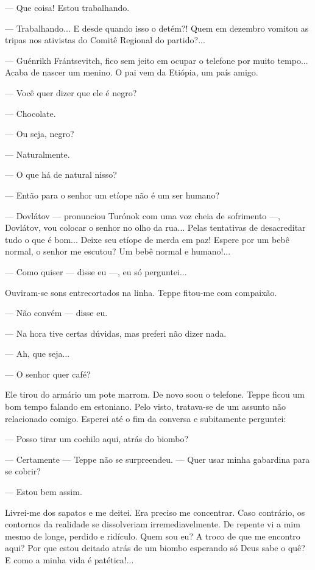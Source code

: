 --- Que coisa! Estou trabalhando.

--- Trabalhando... E desde quando isso o detém?! Quem em dezembro
vomitou as tripas nos ativistas do Comitê Regional do partido?...

--- Guénrikh Frántsevitch, fico sem jeito em ocupar o telefone por muito
tempo... Acaba de nascer um menino. O pai vem da Etiópia, um país amigo.

--- Você quer dizer que ele é negro?

--- Chocolate.

--- Ou seja, negro?

--- Naturalmente.

--- O que há de natural nisso?

--- Então para o senhor um etíope não é um ser humano?

--- Dovlátov --- pronunciou Turónok com uma voz cheia de sofrimento ---,
Dovlátov, vou colocar o senhor no olho da rua... Pelas tentativas de
desacreditar tudo o que é bom... Deixe seu etíope de merda em paz!
Espere por um bebê normal, o senhor me escutou? Um bebê normal e
humano!...

--- Como quiser --- disse eu ---, eu só perguntei...

Ouviram-se sons entrecortados na linha. Teppe fitou-me com compaixão.

--- Não convém --- disse eu.

--- Na hora tive certas dúvidas, mas preferi não dizer nada.

--- Ah, que seja...

--- O senhor quer café?

Ele tirou do armário um pote marrom. De novo soou o telefone. Teppe
ficou um bom tempo falando em estoniano. Pelo visto, tratava-se de um
assunto não relacionado comigo. Esperei até o fim da conversa e
subitamente perguntei:

--- Posso tirar um cochilo aqui, atrás do biombo?

--- Certamente --- Teppe não se surpreendeu. --- Quer usar minha
gabardina para se cobrir?

--- Estou bem assim.

Livrei-me dos sapatos e me deitei. Era preciso me concentrar. Caso
contrário, os contornos da realidade se dissolveriam irremediavelmente.
De repente vi a mim mesmo de longe, perdido e ridículo. Quem sou eu? A
troco de que me encontro aqui? Por que estou deitado atrás de um biombo
esperando só Deus sabe o quê? E como a minha vida é patética!...

